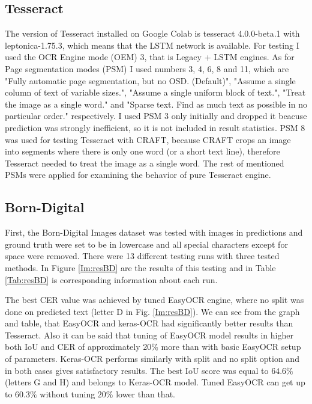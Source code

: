 
\subsection*{Tesseract}
The version of Tesseract installed on Google Colab is tesseract 4.0.0-beta.1 with leptonica-1.75.3, which means that the LSTM network is available. For testing I used the OCR Engine mode (OEM) 3, that is Legacy + LSTM engines. As for Page segmentation modes (PSM) I used numbers 3, 4, 6, 8 and 11, which are "Fully automatic page segmentation, but no OSD. (Default)", "Assume a single column of text of variable sizes.",  "Assume a single uniform block of text.",  "Treat the image as a single word." and "Sparse text. Find as much text as possible in no particular order." respectively. I used PSM 3 only initially and dropped it beacuse prediction was strongly inefficient, so it is not included in result statistics. PSM 8 was used for testing Tesseract with CRAFT, because CRAFT crops an image into segments where there is only one word (or a short text line), therefore Tesseract needed to treat the image as a single word. The rest of mentioned PSMs were applied for examining the behavior of pure Tesseract engine. 




\subsection*{Born-Digital}

First, the Born-Digital Images dataset was tested with images in predictions and ground truth were set to be in lowercase and all special characters except for space were removed. There were 13 different testing runs with three tested methods.  In Figure \ref*{Im:resBD} are the results of this testing and in Table \ref*{Tab:resBD} is corresponding information about each run. 

The best CER value was achieved by tuned EasyOCR engine, where no split was done on predicted text (letter D in Fig. \ref*{Im:resBD}). We can see from the graph and table, that EasyOCR and keras-OCR had significantly better results than Tesseract. Also it can be said that tuning of EasyOCR model results in higher both IoU and CER of approximately 20\% more than with basic EasyOCR setup of parameters. Keras-OCR performs similarly with split and no split option and in both cases gives satisfactory results. The best IoU score was equal to $64.6\%$ (letters G and H) and belongs to Keras-OCR model. Tuned EasyOCR can get up to $60.3\%$ without tuning $20\%$ lower than that.

